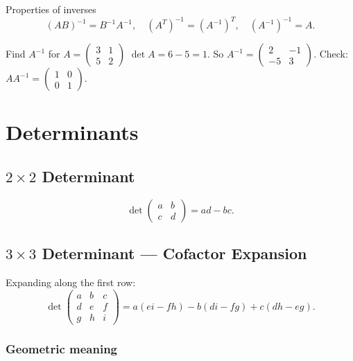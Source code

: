 \documentclass[12pt,a4paper]{article}
\theoremstyle{defstyle}
\begin{document}
\begin{result}{Properties of inverses}{}
\[
  (AB)^{-1}=B^{-1}A^{-1},\quad (A^T)^{-1}=(A^{-1})^T,\quad (A^{-1})^{-1}=A.
\]
\end{result}

\begin{example}{Find $A^{-1}$ for $A=\begin{pmatrix}3&1\\5&2\end{pmatrix}$}{}
\(\det A=6-5=1\). So \(A^{-1}=\begin{pmatrix}2&-1\\-5&3\end{pmatrix}\).
Check: \(AA^{-1}=\begin{pmatrix}1&0\\0&1\end{pmatrix}\). \checkmark
\end{example}

\section{Determinants}

\subsection{\(2\times2\) Determinant}

\[
  \det\begin{pmatrix}a&b\\c&d\end{pmatrix} = ad-bc.
\]

\subsection{\(3\times3\) Determinant --- Cofactor Expansion}

\begin{result}{}{}
Expanding along the first row:
\[
  \det\begin{pmatrix}a&b&c\\d&e&f\\g&h&i\end{pmatrix}
  = a(ei-fh)-b(di-fg)+c(dh-eg).
\]
\end{result}

\subsubsection*{Geometric meaning}
\end{document}
